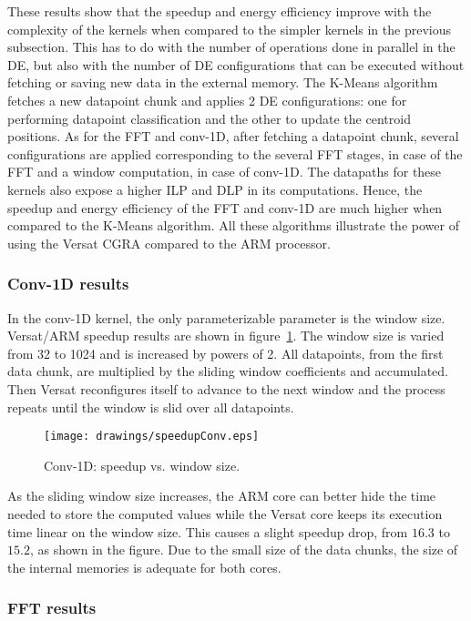 These results show that the speedup and energy efficiency improve with
the complexity of the kernels when compared to the simpler kernels in
the previous subsection. This has to do with the number of operations
done in parallel in the DE, but also with the number of DE
configurations that can be executed without fetching or saving new
data in the external memory. The K-Means algorithm fetches a new
datapoint chunk and applies 2 DE configurations: one for performing
datapoint classification and the other to update the centroid
positions. As for the FFT and conv-1D, after fetching a datapoint
chunk, several configurations are applied corresponding to the several
FFT stages, in case of the FFT and a window computation, in case of
conv-1D. The datapaths for these kernels also expose a higher ILP and
DLP in its computations. Hence, the speedup and energy efficiency of
the FFT and conv-1D are much higher when compared to the K-Means
algorithm. All these algorithms illustrate the power of using the
Versat CGRA compared to the ARM processor.

\subsubsection{Conv-1D results}

In the conv-1D kernel, the only parameterizable parameter is the
window size. Versat/ARM speedup results are shown in
figure~\ref{fig:convsu}.  The window size is varied from 32 to 1024
and is increased by powers of 2. All datapoints, from the first data
chunk, are multiplied by the sliding window coefficients and
accumulated. Then Versat reconfigures itself to advance to the next
window and the process repeats until the window is slid over all
datapoints.

\begin{figure}[!htb]
  \centering \texttt{[image: drawings/speedupConv.eps]}
  \caption{Conv-1D: speedup vs. window size.}
  \label{fig:convsu}
\end{figure}

As the sliding window size increases, the ARM core can better hide the
time needed to store the computed values while the Versat core keeps
its execution time linear on the window size. This causes a slight
speedup drop, from $16.3$ to $15.2$, as shown in the figure. Due to
the small size of the data chunks, the size of the internal memories
is adequate for both cores.

\subsubsection{FFT results}

